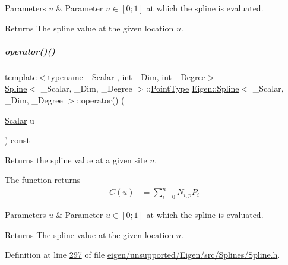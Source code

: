 \begin{DoxyParams}{Parameters}
{\em u} & Parameter $u \in [0;1]$ at which the spline is evaluated. \\
\hline
\end{DoxyParams}
\begin{DoxyReturn}{Returns}
The spline value at the given location $u$. 
\end{DoxyReturn}
\mbox{\label{group___splines___module_a3c7e1838eae4ee7e341ef9d3dbf9ba45}} 
\subparagraph{\texorpdfstring{operator()()}{operator()()}\hspace{0.1cm}{\footnotesize\ttfamily [2/2]}}
{\footnotesize\ttfamily template$<$typename \+\_\+\+Scalar , int \+\_\+\+Dim, int \+\_\+\+Degree$>$ \\
\hyperlink{group___splines___module_class_eigen_1_1_spline}{Spline}$<$ \+\_\+\+Scalar, \+\_\+\+Dim, \+\_\+\+Degree $>$\+::\hyperlink{group___splines___module_a9ade8a2f81dae6eedb8845cb080672bd}{Point\+Type} \hyperlink{group___splines___module_class_eigen_1_1_spline}{Eigen\+::\+Spline}$<$ \+\_\+\+Scalar, \+\_\+\+Dim, \+\_\+\+Degree $>$\+::operator() (\begin{DoxyParamCaption}\item[{\hyperlink{group___splines___module_a8cafd78b564825c76fbb3419653d9742}{Scalar}}]{u }\end{DoxyParamCaption}) const}



Returns the spline value at a given site $u$. 

The function returns \begin{align*} C(u) & = \sum_{i=0}^{n}N_{i,p}P_i \end{align*}


\begin{DoxyParams}{Parameters}
{\em u} & Parameter $u \in [0;1]$ at which the spline is evaluated. \\
\hline
\end{DoxyParams}
\begin{DoxyReturn}{Returns}
The spline value at the given location $u$. 
\end{DoxyReturn}


Definition at line \hyperlink{eigen_2unsupported_2_eigen_2src_2_splines_2_spline_8h_source_l00297}{297} of file \hyperlink{eigen_2unsupported_2_eigen_2src_2_splines_2_spline_8h_source}{eigen/unsupported/\+Eigen/src/\+Splines/\+Spline.\+h}.

